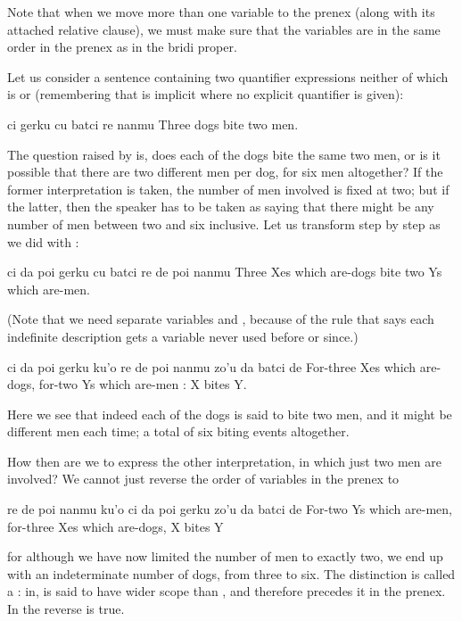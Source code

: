 Note that when we move more than one variable to the prenex
    (along with its attached relative clause), we must make sure
    that the variables are in the same order in the prenex as in
    the bridi proper.



Let us consider a sentence containing two quantifier
    expressions neither of which is  or  (remembering
    that  is implicit where no explicit quantifier is
    given):
\begin{example}
ci gerku cu batci re nanmu\n
Three dogs bite two men.
\end{example}

The question raised by  is, does
    each of the dogs bite the same two men, or is it possible that
    there are two different men per dog, for six men altogether? If
    the former interpretation is taken, the number of men involved
    is fixed at two; but if the latter, then the speaker has to be
    taken as saying that there might be any number of men between
    two and six inclusive. Let us transform  step by step as we did with :
\begin{example}
ci da poi gerku cu batci re de poi nanmu\n
Three Xes which are-dogs bite two Ys which are-men.
\end{example}

(Note that we need separate variables  and ,
    because of the rule that says each indefinite description gets
    a variable never used before or since.)
\begin{example}
ci da poi gerku ku'o\n
\T	re de poi nanmu zo'u\n
\T	da batci de\n
For-three Xes which are-dogs,\n
\T	for-two Ys which are-men :\n
\T	X bites Y.
\end{example}

Here we see that indeed each of the dogs is said to bite two
    men, and it might be different men each time; a total of six
    biting events altogether.

How then are we to express the other interpretation, in
    which just two men are involved? We cannot just reverse the
    order of variables in the prenex to
\begin{example}
re de poi nanmu ku'o\n
\T	ci da poi gerku zo'u da batci de\n
For-two Ys which are-men,\n
\T	for-three Xes which are-dogs, X bites Y
\end{example}

{\noindent}for although we have now limited the number of men to exactly
    two, we end up with an indeterminate number of dogs, from three
    to six. The distinction is called a : in,  is said to have
    wider scope than , and therefore precedes it in the
    prenex. In  the reverse is true.

